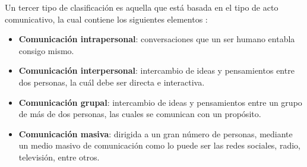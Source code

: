 Un tercer tipo de clasificación es aquella que está basada en el tipo de acto comunicativo, la cual contiene los siguientes elementos \cite{ref23}:
\begin{itemize}
    \item \textbf{Comunicación intrapersonal}: conversaciones que un ser humano entabla consigo mismo.
    \item \textbf{Comunicación interpersonal}: intercambio de ideas y pensamientos entre dos personas, la cuál debe ser directa e interactiva.
    \item \textbf{Comunicación grupal}: intercambio de ideas y pensamientos entre un grupo de más de dos personas, las cuales se comunican con un propósito.
    \item \textbf{Comunicación masiva}: dirigida a un gran número de personas, mediante un medio masivo de comunicación como lo puede ser las redes sociales, radio, televisión, entre otros.
\end{itemize}

